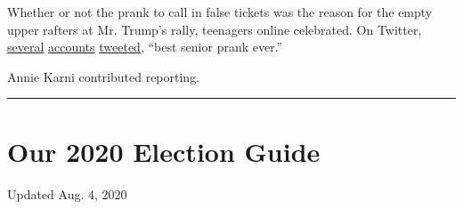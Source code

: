 Whether or not the prank to call in false tickets was the reason for the
empty upper rafters at Mr. Trump's rally, teenagers online celebrated.
On Twitter,
\href{https://twitter.com/sophiadelsol/status/1274145891490959360?s=20}{several}
\href{https://twitter.com/cbjeffreys/status/1274514747241750529?s=20}{accounts}
\href{https://twitter.com/s87788255/status/1274536326528856064?s=20}{tweeted},
``best senior prank ever.''

Annie Karni contributed reporting.

\begin{center}\rule{0.5\linewidth}{\linethickness}\end{center}

\hypertarget{our-2020-election-guide}{%
\section{Our 2020 Election Guide}\label{our-2020-election-guide}}

Updated Aug. 4, 2020

